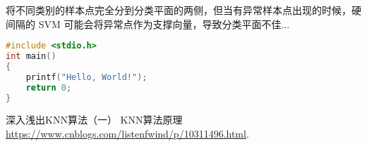 \documentclass[forprint]{report}
\begin{document}
将不同类别的样本点完全分到分类平面的两侧，但当有异常样本点出现的时候，硬间隔的 SVM 可能会将异常点作为支撑向量，导致分类平面不佳\cite{r1}...

\begin{lstlisting}[language=c]
#include <stdio.h>
int main()
{
	printf("Hello, World!");
	return 0;
}
\end{lstlisting}


\cleardoublepage{}
{}
%
\renewcommand{\baselinestretch}{1.6}

\begin{thebibliography}{00}

   深入浅出KNN算法（一） KNN算法原理 \url{https://www.cnblogs.com/listenfwind/p/10311496.html}.

\end{thebibliography}

\cleardoublepage
\end{document}
